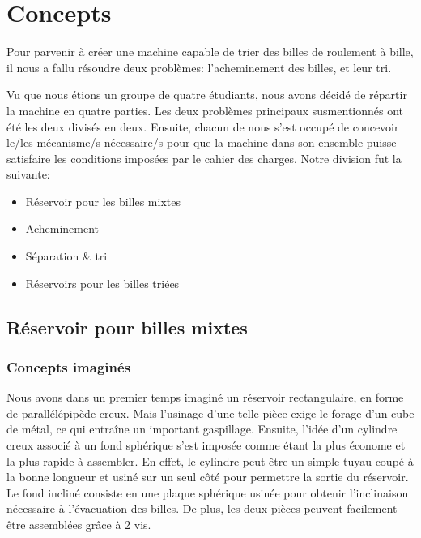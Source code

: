 \chapter{Concepts}
Pour parvenir à créer une machine capable de trier des billes de roulement à bille, il nous a fallu résoudre deux problèmes: l'acheminement des billes, et leur tri.


Vu que nous étions un groupe de quatre étudiants, nous avons décidé de répartir la machine en quatre parties. Les deux problèmes principaux susmentionnés ont été les deux divisés en deux. Ensuite, chacun de nous s'est occupé de concevoir le/les mécanisme/s nécessaire/s pour que la machine dans son ensemble puisse satisfaire les conditions imposées par le cahier des charges. Notre division fut la suivante:
\begin{itemize}
    \item Réservoir pour les billes mixtes
    \item Acheminement
    \item Séparation \& tri
    \item Réservoirs pour les billes triées
\end{itemize}

\section{Réservoir pour billes mixtes}

\subsection{Concepts imaginés}
Nous avons dans un premier temps imaginé un réservoir rectangulaire, en forme de parallélépipède creux. Mais l’usinage d’une telle pièce exige le forage d’un cube de métal, ce qui entraîne un important gaspillage. 
Ensuite, l’idée d’un cylindre creux associé à un fond sphérique s’est imposée comme étant la plus économe et la plus rapide à assembler. En effet, le cylindre peut être un simple tuyau coupé à la bonne longueur et usiné sur un seul côté pour permettre la sortie du réservoir. Le fond incliné consiste en une plaque sphérique usinée pour obtenir l'inclinaison nécessaire à l'évacuation des billes. De plus, les deux pièces peuvent facilement être assemblées grâce à 2 vis.

